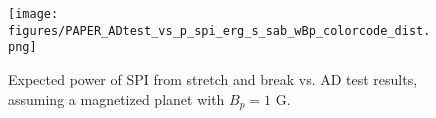 \documentclass[twocolumn]{aastex631}
\begin{document}
\begin{figure*}[ht!]
    \begin{centering}
        \texttt{[image: figures/PAPER\_ADtest\_vs\_p\_spi\_erg\_s\_sab\_wBp\_colorcode\_dist.png]}
        \caption{
            Expected power of SPI from stretch and break vs. AD test results, assuming a magnetized planet with $B_p=1$ G. 
        }
        \label{appendix:fig:adtest_p_spi_erg_s}
    \end{centering}
\end{figure*}
\end{document}
